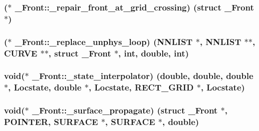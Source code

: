 \subsubsection[{\texorpdfstring{\+\_\+repair\+\_\+front\+\_\+at\+\_\+grid\+\_\+crossing}{_repair_front_at_grid_crossing}}]{($\ast$ \+\_\+\+Front\+::\+\_\+repair\+\_\+front\+\_\+at\+\_\+grid\+\_\+crossing) (struct {\bf \+\_\+\+Front} $\ast$)}\hypertarget{struct___front_a5990b74ab1e3f34ecdaf4ac4fa8d1ed5}{}\label{struct___front_a5990b74ab1e3f34ecdaf4ac4fa8d1ed5}
\subsubsection[{\texorpdfstring{\+\_\+replace\+\_\+unphys\+\_\+loop}{_replace_unphys_loop}}]{($\ast$ \+\_\+\+Front\+::\+\_\+replace\+\_\+unphys\+\_\+loop) ({\bf N\+N\+L\+I\+ST} $\ast$, {\bf N\+N\+L\+I\+ST} $\ast$$\ast$, {\bf C\+U\+R\+VE} $\ast$$\ast$, struct {\bf \+\_\+\+Front} $\ast$, int, double, int)}\hypertarget{struct___front_ae193b172d736fac5ed72b80c94f24ad1}{}\label{struct___front_ae193b172d736fac5ed72b80c94f24ad1}
\subsubsection[{\texorpdfstring{\+\_\+state\+\_\+interpolator}{_state_interpolator}}]{\setlength{\rightskip}{0pt plus 5cm}void($\ast$ \+\_\+\+Front\+::\+\_\+state\+\_\+interpolator) (double, double, double $\ast$, {\bf Locstate}, double $\ast$, {\bf Locstate}, {\bf R\+E\+C\+T\+\_\+\+G\+R\+ID} $\ast$, {\bf Locstate})}\hypertarget{struct___front_a12bbfd29dd44c280fda77ca1de494deb}{}\label{struct___front_a12bbfd29dd44c280fda77ca1de494deb}
\subsubsection[{\texorpdfstring{\+\_\+surface\+\_\+propagate}{_surface_propagate}}]{\setlength{\rightskip}{0pt plus 5cm}void($\ast$ \+\_\+\+Front\+::\+\_\+surface\+\_\+propagate) (struct {\bf \+\_\+\+Front} $\ast$, {\bf P\+O\+I\+N\+T\+ER}, {\bf S\+U\+R\+F\+A\+CE} $\ast$, {\bf S\+U\+R\+F\+A\+CE} $\ast$, double)}\hypertarget{struct___front_ac039d7e67fc355f6699052b7fc20f3e0}{}\label{struct___front_ac039d7e67fc355f6699052b7fc20f3e0}
